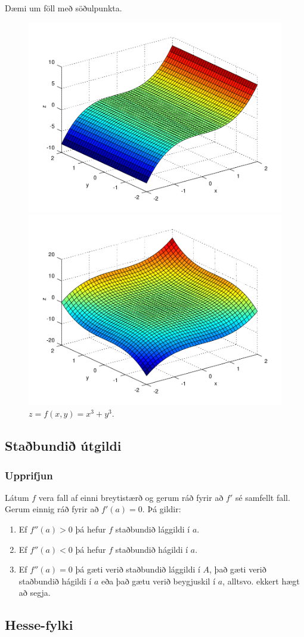 Dæmi um föll með söðulpunkta.
   \begin{figure}[!h]
        \centering
        \begin{minipage}{\textwidth}
            \centering
            \includegraphics[width=.9 pt \linewidth]{sodull1.png}
            \caption*{$z = f(x,y) = x^3$.}
        \end{minipage}%
        \begin{minipage}{\textwidth}
            \centering
            \includegraphics[width=.9 pt \linewidth]{sodull2.png}
            \caption*{$z = f(x,y) = x^3+y^3$.}
        \end{minipage}
   \end{figure}



\subsection{Staðbundið útgildi} 

\subsubsection{Upprifjun  }
 Látum $f$ vera fall af einni breytistærð og
gerum ráð fyrir að $f'$ sé samfellt fall.  Gerum einnig ráð fyrir að
$f'(a)=0$.  Þá gildir: 

\begin {enumerate}
 \item Ef $f''(a)>0$ þá hefur $f$ staðbundið lággildi í $a$.
 \item  Ef $f''(a)<0$ þá hefur $f$ staðbundið hágildi í $a$.
 \item  Ef $f''(a)=0$ þá gæti verið staðbundið lággildi í $A$, það gæti
     verið staðbundið hágildi í $a$ eða það gætu verið beygjuskil í
     $a$, alltsvo. ekkert hægt að segja. 
 \end {enumerate}






\subsection{Hesse-fylki} 

